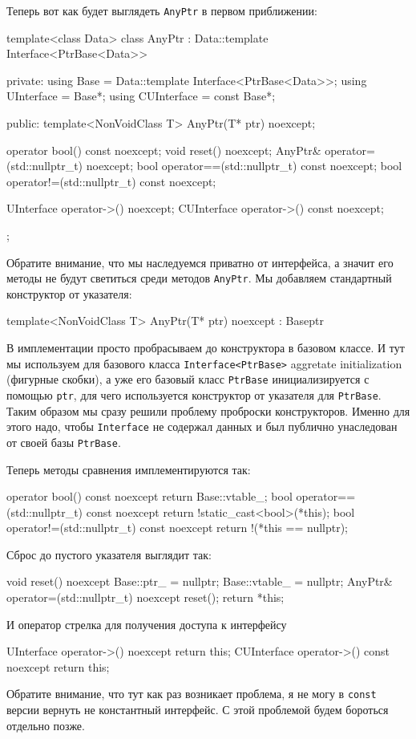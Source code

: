 Теперь вот как будет выглядеть \verb"AnyPtr" в первом приближении:
\begin{cppcode}
template<class Data>
class AnyPtr : Data::template Interface<PtrBase<Data>> {
private:
  using Base = Data::template Interface<PtrBase<Data>>;
  using UInterface = Base*;
  using CUInterface = const Base*;

public:
  template<NonVoidClass T>
  AnyPtr(T* ptr) noexcept;
  
  operator bool() const noexcept;
  void reset() noexcept;
  AnyPtr& operator=(std::nullptr_t) noexcept;
  bool operator==(std::nullptr_t) const noexcept;
  bool operator!=(std::nullptr_t) const noexcept;

  UInterface operator->() noexcept;
  CUInterface operator->() const noexcept;
};
\end{cppcode}
Обратите внимание, что мы наследуемся приватно от интерфейса, а значит его методы не будут светиться среди методов \verb"AnyPtr".
Мы добавляем стандартный конструктор от указателя:
\begin{cppcode}
template<NonVoidClass T>
AnyPtr(T* ptr) noexcept : Base{ptr} { }
\end{cppcode}
В имплементации просто пробрасываем до конструктора в базовом классе.
И тут мы используем для базового класса \verb"Interface<PtrBase>" aggretate initialization (фигурные скобки), а уже его базовый класс \verb"PtrBase" инициализируется с помощью \verb"ptr", для чего используется конструктор от указателя для \verb"PtrBase".
Таким образом мы сразу решили проблему проброски конструкторов.
Именно для этого надо, чтобы \verb"Interface" не содержал данных и был публично унаследован от своей базы \verb"PtrBase".

Теперь методы сравнения имплементируются так:
\begin{cppcode}
operator bool() const noexcept {
  return Base::vtable_;
}
bool operator==(std::nullptr_t) const noexcept {
  return !static_cast<bool>(*this);
}
bool operator!=(std::nullptr_t) const noexcept {
  return !(*this == nullptr);
}
\end{cppcode}
Сброс до пустого указателя выглядит так:
\begin{cppcode}
void reset() noexcept {
  Base::ptr_ = nullptr;
  Base::vtable_ = nullptr;
}
AnyPtr& operator=(std::nullptr_t) noexcept {
  reset();
  return *this;
}
\end{cppcode}
И оператор стрелка для получения доступа к интерфейсу
\begin{cppcode}
UInterface operator->() noexcept {
  return this;
}
CUInterface operator->() const noexcept {
  return this;
}
\end{cppcode}
Обратите внимание, что тут как раз возникает проблема, я не могу в \verb"const" версии вернуть не константный интерфейс.
С этой проблемой будем бороться отдельно позже.

